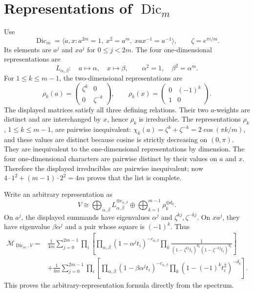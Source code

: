 \documentclass[11pt]{article}
\newcommand{\Dic}{\operatorname{Dic}}
\newcommand{\M}{\mathcal M}
\begin{document}
\section{Representations of \texorpdfstring{$\Dic_m$}{Dic-m}}
Use
\[
 \Dic_m=\langle a,x:a^{2m}=1,\ x^2=a^m,\ xax^{-1}=a^{-1}\rangle,
 \qquad \zeta=e^{\pi i/m}.
\]
Its elements are $a^j$ and $xa^j$ for $0\le j<2m$.
The four one-dimensional representations are
\[
 L_{\alpha,\beta}:\quad a\mapsto\alpha,\quad x\mapsto\beta,
 \qquad \alpha^2=1,\quad\beta^2=\alpha^m.
\]
For $1\le k\le m-1$, the two-dimensional representations are
\[
 \rho_k(a)=\begin{pmatrix}\zeta^k&0\\0&\zeta^{-k}\end{pmatrix},\qquad
 \rho_k(x)=\begin{pmatrix}0&(-1)^k\\1&0\end{pmatrix}.
\]
The displayed matrices satisfy all three defining relations.  Their two
$a$-weights are distinct and are interchanged by $x$, hence $\rho_k$ is
irreducible.  The representations $\rho_k$, $1\leq k\leq m-1$, are pairwise
inequivalent: $\chi_k(a)=\zeta^k+\zeta^{-k}=2\cos(\pi k/m)$, and these values
are distinct because cosine is strictly decreasing on $(0,\pi)$.  They are
inequivalent to the one-dimensional representations by dimension.  The four
one-dimensional characters are pairwise distinct by their values on $a$ and
$x$.  Therefore the displayed irreducibles are pairwise inequivalent; now
$4\cdot1^2+(m-1)\cdot2^2=4m$ proves that the list is complete.

Write an arbitrary representation as
\[
 V\cong\bigoplus_{\alpha,\beta}L_{\alpha,\beta}^{\oplus c_{\alpha,\beta}}
 \oplus\bigoplus_{k=1}^{m-1}\rho_k^{\oplus d_k}.
\]
On $a^j$, the displayed summands have eigenvalues $\alpha^j$ and
$\zeta^{kj},\zeta^{-kj}$.  On $xa^j$, they have eigenvalue
$\beta\alpha^j$ and a pair whose square is $(-1)^k$.  Thus
\begin{align*}
\M_{\Dic_m,V}
={}&\frac1{4m}\sum_{j=0}^{2m-1}\prod_i
 \left[\prod_{\alpha,\beta}(1-\alpha^jt_i)^{-c_{\alpha,\beta}}
 \prod_k\frac1{(1-\zeta^{kj}t_i)^{d_k}(1-\zeta^{-kj}t_i)^{d_k}}\right]\\
&+\frac1{4m}\sum_{j=0}^{2m-1}\prod_i
 \left[\prod_{\alpha,\beta}(1-\beta\alpha^jt_i)^{-c_{\alpha,\beta}}
 \prod_k(1-(-1)^kt_i^2)^{-d_k}\right].
\end{align*}
This proves the arbitrary-representation formula directly from the spectrum.
\end{document}
